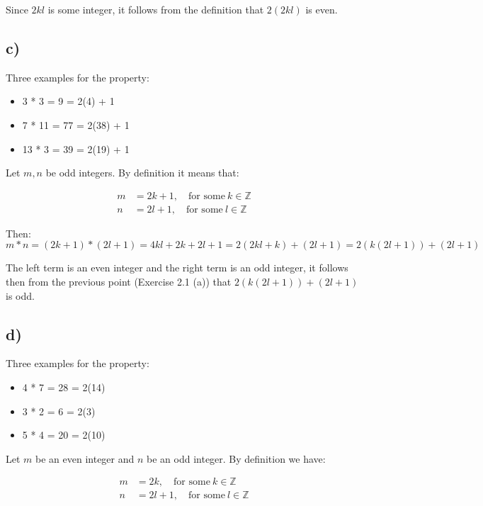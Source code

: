 \documentclass{article}
\begin{document}
Since $2kl$ is some integer, it follows from the definition that $2(2kl)$ is
even.

\subsection*{c)}


Three examples for the property:

\begin{itemize}
	\item 3 * 3 = 9 = 2(4) + 1
	\item 7 * 11 = 77 = 2(38) + 1 
	\item 13 * 3 = 39 = 2(19) + 1
\end{itemize}

Let $m,n$ be odd integers. By definition it means that:


\begin{align*}
	m &= 2k + 1, \quad \mbox{for some}\ k \in \mathbb{Z} \\	
	n &= 2l + 1, \quad \mbox{for some}\ l \in \mathbb{Z}
\end{align*}

Then:
\begin{equation*}
	m * n = (2k+1) * (2l+1) = 4kl + 2k + 2l + 1 = 2(2kl + k) + (2l + 1) =
	2(k(2l+1)) + (2l+1)
\end{equation*}


The left term is an even integer and the right term is an odd integer, it
follows then from the previous point (Exercise 2.1 (a)) that $2(k(2l+1)) +
(2l+1)$ is odd.


\subsection*{d)}


Three examples for the property:

\begin{itemize}
	\item 4 * 7 = 28 = 2(14)
	\item 3 * 2 = 6 = 2(3)
	\item 5 * 4 = 20 = 2(10)
\end{itemize}

Let $m$ be an even integer and $n$ be an odd integer. By definition we have:


\begin{align*}
	m &= 2k, \quad \mbox{for some}\ k \in \mathbb{Z} \\	
	n &= 2l + 1, \quad \mbox{for some}\ l \in \mathbb{Z}
\end{align*}
\end{document}
